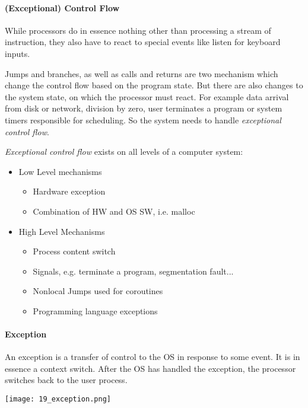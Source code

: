 
\paragraph{(Exceptional) Control Flow}
While processors do in essence nothing other than processing a stream of instruction, they also have to react to special events like listen for keyboard inputs. 

Jumps and branches, as well as calls and returns are two mechanism which change the control flow based on the program state. But there are also changes to the system state, on which the processor must react. For example data arrival from disk or network, division by zero, user terminates a program or system timers responsible for scheduling. So the system needs to handle \textit{exceptional control flow}.

\textit{Exceptional control flow} exists on all levels of a computer system:
\begin{itemize}
    \item Low Level mechanisms
        \begin{itemize}
            \item Hardware exception
            \item Combination of HW and OS SW, i.e. malloc
        \end{itemize}
    \item High Level Mechanisms
        \begin{itemize}
            \item Process content switch
            \item Signals, e.g. terminate a program, segmentation fault...
            \item Nonlocal Jumps used for coroutines
            \item Programming language exceptions
        \end{itemize}
\end{itemize}

\paragraph{Exception}
An exception is a transfer of control to the OS in response to some event. It is in essence a context switch. After the OS has handled the exception, the processor switches back to the user process.

\texttt{[image: 19\_exception.png]}

